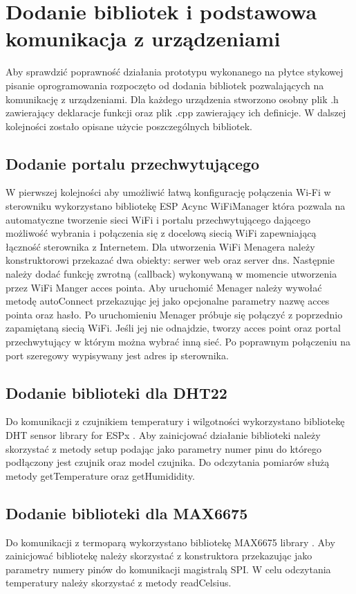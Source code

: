\documentclass[11pt]{report}
\begin{document}
 \section{Dodanie bibliotek i podstawowa komunikacja z urządzeniami}
 Aby sprawdzić poprawność działania prototypu wykonanego na płytce stykowej pisanie oprogramowania rozpoczęto od dodania bibliotek pozwalających na komunikację z urządzeniami. Dla każdego urządzenia stworzono osobny plik .h zawierający deklaracje funkcji oraz plik .cpp zawierający ich definicje.
 W dalszej kolejności zostało opisane użycie poszczególnych bibliotek.
  \subsection{Dodanie portalu przechwytującego}
 W pierwszej kolejności aby umożliwić łatwą konfigurację połączenia Wi-Fi w sterowniku wykorzystano bibliotekę ESP Acync WiFiManager \cite{WiFiManager} która pozwala na automatyczne tworzenie sieci WiFi i portalu przechwytującego dającego możliwość wybrania i połączenia się z docelową siecią WiFi zapewniającą łączność sterownika z Internetem. 
 Dla utworzenia  WiFi Menagera należy konstruktorowi przekazać dwa obiekty: serwer web oraz server dns. Następnie należy dodać funkcję zwrotną (callback) wykonywaną w momencie utworzenia przez WiFi Manger acces pointa. Aby uruchomić Menager należy wywołać metodę autoConnect przekazując jej jako opcjonalne parametry nazwę acces pointa oraz hasło. Po uruchomieniu Menager próbuje się połączyć z poprzednio zapamiętaną siecią WiFi. Jeśli jej nie odnajdzie, tworzy acces point oraz portal przechwytujący w którym można wybrać inną sieć. Po poprawnym połączeniu na port szeregowy wypisywany jest adres ip sterownika.
 \subsection{Dodanie biblioteki dla DHT22}
 Do komunikacji z czujnikiem temperatury i wilgotności wykorzystano bibliotekę DHT sensor library for ESPx \cite{DHTlibrary}. Aby zainicjować działanie biblioteki należy skorzystać z metody setup podając jako parametry numer pinu do którego podłączony jest czujnik oraz model czujnika. Do odczytania pomiarów służą metody getTemperature oraz getHumididity.
 \subsection{Dodanie biblioteki dla MAX6675}
 Do komunikacji z termoparą wykorzystano bibliotekę MAX6675 library \cite{MAX6675library}. Aby zainicjować bibliotekę należy skorzystać z konstruktora przekazując jako parametry numery pinów do komunikacji magistralą SPI.
 W celu odczytania temperatury należy skorzystać z metody readCelsius.
\end{document}
